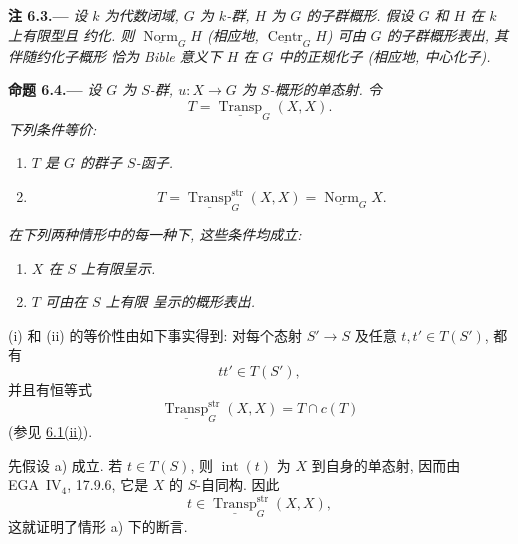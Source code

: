 
\medskip
{}\label{rem:sga3-VIB-6.3}%
\noindent\textbf{注 6.3.---}
\emph{设 \(k\) 为代数闭域, \(G\) 为
\(k\)-群, \(H\) 为 \(G\) 的子群概形. 假设
\(G\) 和 \(H\) 在 \(k\) 上有限型且
约化. 则
\(\underline{\operatorname{Norm}}_G H\) (相应地,
\(\underline{\operatorname{Centr}}_G H\)) 可由
\(G\) 的子群概形表出, 其伴随约化子概形
恰为 \emph{Bible} 意义下 \(H\) 在
\(G\) 中的正规化子 (相应地, 中心化子).}

\medskip
{}\label{prop:sga3-VIB-6.4}%
\noindent\textbf{命题 6.4.---}
\emph{设 \(G\) 为 \(S\)-群, \(u:X\to G\) 为
\(S\)-概形的单态射. 令}
\[
  T=\underline{\operatorname{Transp}}_G(X,X).
\]
\emph{下列条件等价:}
\begin{enumerate}
\item[\textup{(i)}]\label{cond:sga3-VIB-6.4-i}
  \emph{\(T\) 是 \(G\) 的群子 \(S\)-函子.}
\item[\textup{(ii)}]\label{cond:sga3-VIB-6.4-ii}
  \emph{\[
    T=\underline{\operatorname{Transp}}^{\mathrm{str}}_G(X,X)
     =\underline{\operatorname{Norm}}_G X.
  \]}
\end{enumerate}
\emph{在下列两种情形中的每一种下, 这些条件均成立:}
\begin{enumerate}
\item[\textup{a)}]\label{case:sga3-VIB-6.4-a}
  \emph{\(X\) 在 \(S\) 上有限呈示.}
\item[\textup{b)}]\label{case:sga3-VIB-6.4-b}
  \emph{\(T\) 可由在 \(S\) 上有限
  呈示的概形表出.}
\end{enumerate}

\textup{(i)} 和 \textup{(ii)} 的等价性由如下事实得到:
对每个态射 \(S'\to S\) 及任意
\(t,t'\in T(S')\), 都有
\[
  tt'\in T(S'),
\]
并且有恒等式
\[
  \underline{\operatorname{Transp}}^{\mathrm{str}}_G(X,X)
  =T\cap c(T)
\]
(参见 \hyperref[def:sga3-VIB-6.1]{6.1\textup{(ii)}}).

先假设 \textup{a)} 成立. 若 \(t\in T(S)\), 则
\(\operatorname{int}(t)\) 为 \(X\) 到自身的单态射,
因而由 EGA~IV\(_4\), 17.9.6, 它是 \(X\) 的 \(S\)-自同构.
因此
\[
  t\in\underline{\operatorname{Transp}}^{\mathrm{str}}_G(X,X),
\]
这就证明了情形 \textup{a)} 下的断言.

